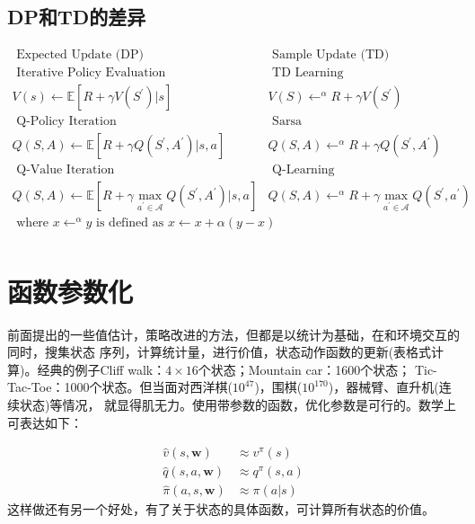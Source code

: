 \documentclass[UTF8]{ctexart}
\begin{document}
\subsection{DP和TD的差异}

$$\begin{array}{l|l}
    \text { Expected Update (DP) } & \text { Sample Update (TD) } \\
    \hline \text { Iterative Policy Evaluation } & \text { TD Learning } \\
    V(s) \leftarrow \mathbb{E}\left[R+\gamma V\left(S^{\prime}\right) | s\right] & V(S) \leftarrow^{\alpha} R+\gamma V\left(S^{\prime}\right) \\
    \hline \text { Q-Policy Iteration } & \text { Sarsa } \\
    Q(S, A) \leftarrow \mathbb{E}\left[R+\gamma Q\left(S^{\prime}, A^{\prime}\right) | s, a\right] & Q(S, A) \leftarrow^{\alpha} R+\gamma Q\left(S^{\prime}, A^{\prime}\right) \\
    \hline \text { Q-Value Iteration } & \text { Q-Learning } \\
    Q(S, A) \leftarrow \mathbb{E}\left[R+\gamma \max _{a^{\prime} \in \mathcal{A}} Q\left(S^{\prime}, A^{\prime}\right) | s, a\right] & Q(S, A) \leftarrow^{\alpha} R+\gamma \max _{a^{\prime} \in \mathcal{A}} Q\left(S^{\prime}, a^{\prime}\right) \\
    \hline \text { where } x \leftarrow^{\alpha} y \text { is defined as } x \leftarrow x+\alpha(y-x) & \\
 \end{array}
 $$

\section{函数参数化}
前面提出的一些值估计，策略改进的方法，但都是以统计为基础，在和环境交互的同时，搜集状态
序列，计算统计量，进行价值，状态动作函数的更新(表格式计算)。经典的例子Cliff walk：$4\times 16$个状态；Mountain car：1600个状态；
Tic-Tac-Toe：1000个状态。但当面对西洋棋($10^{47}$)，围棋($10^{170}$)，器械臂、直升机(连续状态)等情况，
就显得肌无力。使用带参数的函数，优化参数是可行的。数学上可表达如下：

\begin{equation}
    \begin{aligned}
    \hat{v}(s, \mathbf{w}) & \approx v^{\pi}(s) \\
    \hat{q}(s, a, \mathbf{w}) & \approx q^{\pi}(s, a) \\
    \hat{\pi}(a, s, \mathbf{w}) & \approx \pi(a | s)
    \end{aligned}
\end{equation}
这样做还有另一个好处，有了关于状态的具体函数，可计算所有状态的价值。
\end{document}
